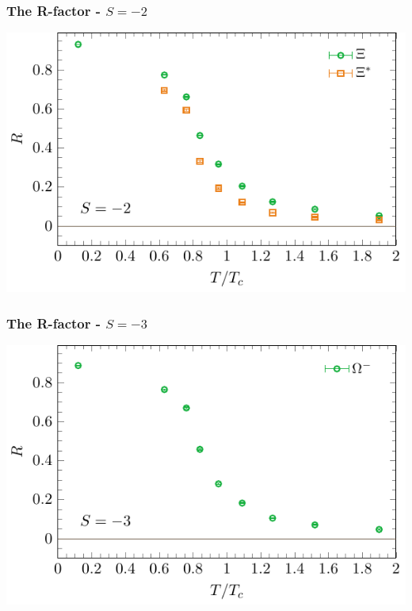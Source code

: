 \documentclass[11pt]{beamer}
\begin{document}
\begin{frame}
  \frametitle{The R-factor - $S = -2$}

  \vspace{6mm}
  \begin{center}
    \hspace*{-5mm}
    \includegraphics[width=\textwidth]{plots/sumR_s2.pdf}
  \end{center}

\end{frame}

\begin{frame}
  \frametitle{The R-factor - $S = -3$}

  \vspace{6mm}
  \begin{center}
    \hspace*{-5mm}
    \includegraphics[width=\textwidth]{plots/sumR_omega.pdf}
  \end{center}

\end{frame}
\end{document}
